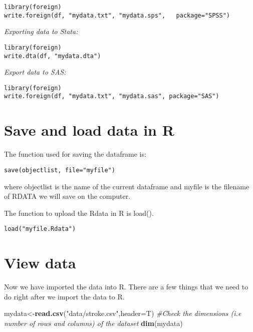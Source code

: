 \documentclass[]{book}
\newenvironment{Shaded}{\begin{snugshade}}{\end{snugshade}}
\newcommand{\KeywordTok}[1]{\textcolor[rgb]{0.13,0.29,0.53}{\textbf{#1}}}
\newcommand{\DataTypeTok}[1]{\textcolor[rgb]{0.13,0.29,0.53}{#1}}
\newcommand{\StringTok}[1]{\textcolor[rgb]{0.31,0.60,0.02}{#1}}
\newcommand{\CommentTok}[1]{\textcolor[rgb]{0.56,0.35,0.01}{\textit{#1}}}
\newcommand{\NormalTok}[1]{#1}
\theoremstyle{definition}
\theoremstyle{definition}
\theoremstyle{definition}
\theoremstyle{remark}
\begin{document}
\begin{verbatim}
library(foreign)
write.foreign(df, "mydata.txt", "mydata.sps",   package="SPSS")
\end{verbatim}

\emph{Exporting data to Stata:}

\begin{verbatim}
library(foreign)
write.dta(df, "mydata.dta")
\end{verbatim}

\emph{Export data to SAS:}

\begin{verbatim}
library(foreign)
write.foreign(df, "mydata.txt", "mydata.sas", package="SAS")
\end{verbatim}

\section{Save and load data in R}\label{save-and-load-data-in-r}

The function used for saving the dataframe is:

\begin{verbatim}
save(objectlist, file="myfile")
\end{verbatim}

where objectlist is the name of the current dataframe and myfile is the
filename of RDATA we will save on the computer.

The function to upload the Rdata in R is load().

\begin{verbatim}
load("myfile.Rdata")
\end{verbatim}

\section{View data}\label{view-data}

Now we have imported the data into R. There are a few things that we
need to do right after we import the data to R.

\begin{Shaded}
\begin{Highlighting}[]
\NormalTok{mydata<-}\KeywordTok{read.csv}\NormalTok{(}\StringTok{"data/stroke.csv"}\NormalTok{,}\DataTypeTok{header=}\NormalTok{T)}
\CommentTok{#Check the dimensions (i.e number of rows and columns) of the dataset }
\KeywordTok{dim}\NormalTok{(mydata)}
\end{Highlighting}
\end{Shaded}
\end{document}
